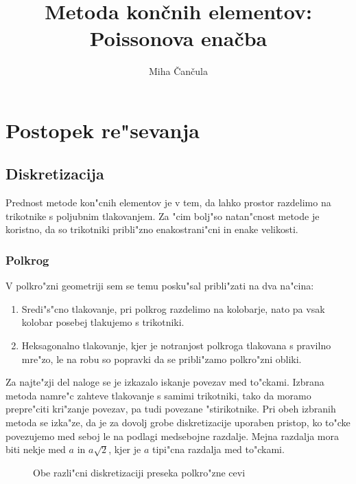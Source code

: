 \documentclass[a4paper,10pt]{article}
\title{Metoda kon\v cnih elementov: \\ Poissonova ena\v cba}
\author{Miha \v Can\v cula}
\begin{document}
\maketitle

\section{Postopek re"sevanja}

\subsection{Diskretizacija}

Prednost metode kon"cnih elementov je v tem, da lahko prostor razdelimo na trikotnike s poljubnim tlakovanjem. Za "cim bolj"so natan"cnost metode je koristno, da so trikotniki pribli"zno enakostrani"cni in enake velikosti. 

\subsubsection{Polkrog}

V polkro"zni geometriji sem se temu posku"sal pribli"zati na dva na"cina:

\begin{enumerate}
 \item Sredi"s"cno tlakovanje, pri polkrog razdelimo na kolobarje, nato pa vsak kolobar posebej tlakujemo s trikotniki. 
 \item Heksagonalno tlakovanje, kjer je notranjost polkroga tlakovana s pravilno mre"zo, le na robu so popravki da se pribli"zamo polkro"zni obliki. 
\end{enumerate}

Za najte"zji del naloge se je izkazalo iskanje povezav med to"ckami. Izbrana metoda namre"c zahteve tlakovanje s samimi trikotniki, tako da moramo prepre"citi kri"zanje povezav, pa tudi povezane "stirikotnike. Pri obeh izbranih metoda se izka"ze, da je za dovolj grobe diskretizacije uporaben pristop, ko to"cke povezujemo med seboj le na podlagi medsebojne razdalje. Mejna razdalja mora biti nekje med $a$ in $a\sqrt{2}$, kjer je $a$ tipi"cna razdalja med to"ckami. 

\begin{figure}[H]
\caption{Obe razli"cni diskretizaciji preseka polkro"zne cevi}
\label{fig:povezave-polkrog}
\end{figure}
\end{document}

